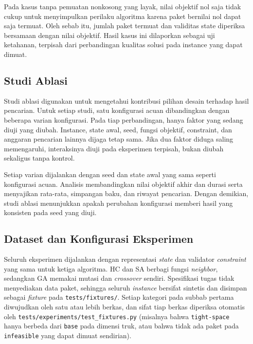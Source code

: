 Pada kasus tanpa pemuatan nonkosong yang layak, nilai objektif nol saja tidak cukup untuk menyimpulkan perilaku algoritma karena paket bernilai nol dapat saja termuat. Oleh sebab itu, jumlah paket termuat dan validitas state diperiksa bersamaan dengan nilai objektif. Hasil kasus ini dilaporkan sebagai uji ketahanan, terpisah dari perbandingan kualitas solusi pada instance yang dapat dimuat.

\subsection{Studi Ablasi}

Studi ablasi digunakan untuk mengetahui kontribusi pilihan desain terhadap hasil pencarian. Untuk setiap studi, satu konfigurasi acuan dibandingkan dengan beberapa varian konfigurasi. Pada tiap perbandingan, hanya faktor yang sedang diuji yang diubah. Instance, state awal, seed, fungsi objektif, constraint, dan anggaran pencarian lainnya dijaga tetap sama. Jika dua faktor diduga saling memengaruhi, interaksinya diuji pada eksperimen terpisah, bukan diubah sekaligus tanpa kontrol.

Setiap varian dijalankan dengan seed dan state awal yang sama seperti konfigurasi acuan. Analisis membandingkan nilai objektif akhir dan durasi serta menyajikan rata-rata, simpangan baku, dan riwayat pencarian. Dengan demikian, studi ablasi menunjukkan apakah perubahan konfigurasi memberi hasil yang konsisten pada seed yang diuji.

\subsection{Dataset dan Konfigurasi Eksperimen}
Seluruh eksperimen dijalankan dengan representasi \textit{state} dan validator \textit{constraint} yang sama untuk ketiga algoritma. HC dan SA berbagi fungsi \textit{neighbor}, sedangkan GA memakai mutasi dan \textit{crossover} sendiri. Spesifikasi tugas tidak menyediakan data paket, sehingga seluruh \textit{instance} bersifat sintetis dan disimpan sebagai \textit{fixture} pada \texttt{tests/fixtures/}. Setiap kategori pada subbab pertama diwujudkan oleh satu atau lebih berkas, dan sifat tiap berkas diperiksa otomatis oleh \texttt{tests/\allowbreak experiments/\allowbreak test\_fixtures.py} (misalnya bahwa \texttt{tight-space} hanya berbeda dari \texttt{base} pada dimensi truk, atau bahwa tidak ada paket pada \texttt{infeasible} yang dapat dimuat sendirian).

